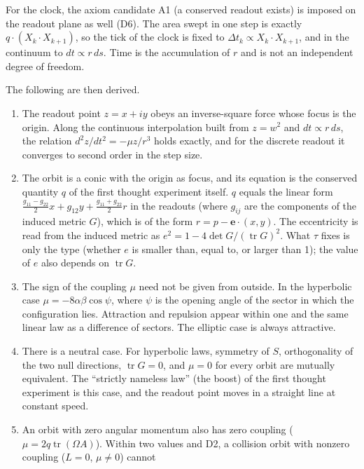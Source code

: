 \documentclass[
  a4paper,
]{article}
\providecommand{\tightlist}{%
  \setlength{\itemsep}{0pt}\setlength{\parskip}{0pt}}
\begin{document}
For the clock, the axiom candidate A1 (a conserved readout exists) is
imposed on the readout plane as well (D6). The area swept in one step is
exactly \(q\cdot(X_k\cdot X_{k+1})\), so the tick of the clock is fixed
to \(\Delta t_k\propto X_k\cdot X_{k+1}\), and in the continuum to
\(dt\propto r\,ds\). Time is the accumulation of \(r\) and is not an
independent degree of freedom.

The following are then derived.

\begin{enumerate}
\def\labelenumi{\arabic{enumi}.}
\tightlist
\item
  The readout point \(z=x+iy\) obeys an inverse-square force whose focus
  is the origin. Along the continuous interpolation built from \(z=w^2\)
  and \(dt\propto r\,ds\), the relation \(d^2z/dt^2=-\mu z/r^3\) holds
  exactly, and for the discrete readout it converges to second order in
  the step size.
\item
  The orbit is a conic with the origin as focus, and its equation is the
  conserved quantity \(q\) of the first thought experiment itself. \(q\)
  equals the linear form
  \(\frac{g_{11}-g_{22}}{2}x+g_{12}y+\frac{g_{11}+g_{22}}{2}r\) in the
  readouts (where \(g_{ij}\) are the components of the induced metric
  \(G\)), which is of the form \(r=p-\mathbf e\cdot(x,y)\). The
  eccentricity is read from the induced metric as
  \(e^2=1-4\det G/(\operatorname{tr}G)^2\). What \(\tau\) fixes is only
  the type (whether \(e\) is smaller than, equal to, or larger than 1);
  the value of \(e\) also depends on \(\operatorname{tr}G\).
\item
  The sign of the coupling \(\mu\) need not be given from outside. In
  the hyperbolic case \(\mu=-8\alpha\beta\cos\psi\), where \(\psi\) is
  the opening angle of the sector in which the configuration lies.
  Attraction and repulsion appear within one and the same linear law as
  a difference of sectors. The elliptic case is always attractive.
\item
  There is a neutral case. For hyperbolic laws, symmetry of \(S\),
  orthogonality of the two null directions, \(\operatorname{tr}G=0\),
  and \(\mu=0\) for every orbit are mutually equivalent. The ``strictly
  nameless law'' (the boost) of the first thought experiment is this
  case, and the readout point moves in a straight line at constant
  speed.
\item
  An orbit with zero angular momentum also has zero coupling
  (\(\mu=2q\operatorname{tr}(\Omega A)\)). Within two values and D2, a
  collision orbit with nonzero coupling (\(L=0\), \(\mu\neq0\)) cannot

\end{enumerate}
\end{document}
